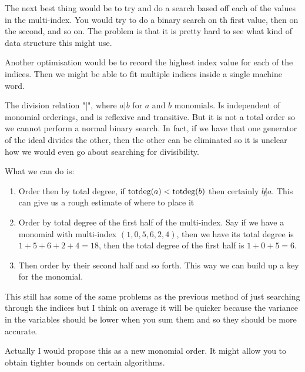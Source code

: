The next best thing would be to try and do a search based off each of the values in the multi-index. You would try to do a binary search on th first value, then on the second, and so on. The problem is that it is pretty hard to see what kind of data structure this might use.

Another optimisation would be to record the highest index value for each of the indices. Then we might be able to fit multiple indices inside a single machine word.

The division relation "|", where $a | b$ for $a$ and $b$ monomials. Is independent of monomial orderings, and is reflexive and transitive. But it is not a total order so we cannot perform a normal binary search. In fact, if we have that one generator of the ideal divides the other, then the other can be eliminated so it is unclear how we would even go about searching for divisibility.

What we can do is:
\begin{enumerate}
    \item Order then by total degree, if $\textrm{totdeg}(a) < \textrm{totdeg}(b)$ then certainly $b \not | a$. This can give us a rough estimate of where to place it
    \item Order by total degree of the first half of the multi-index. Say if we have a monomial with multi-index $(1, 0, 5, 6, 2, 4)$, then we have its total degree is $1 + 5 + 6 + 2 + 4 = 18$, then the total degree of the first half is $1 + 0 + 5 = 6$.
    \item Then order by their second half and so forth. This way we can build up a key for the monomial.
\end{enumerate}

This still has some of the same problems as the previous method of just searching through the indices but I think on average it will be quicker because the variance in the variables should be lower when you sum them and so they should be more accurate.

Actually I would propose this as a new monomial order. It might allow you to obtain tighter bounds on certain algorithms.
